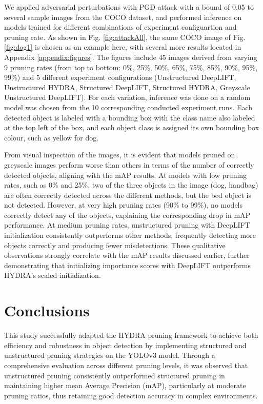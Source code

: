\documentclass[journal,onecolumn,12pt]{IEEEtran}
\begin{document}
We applied adversarial perturbations with PGD attack with a bound of 0.05 to several sample images from the COCO dataset, and performed inference on models trained for different combinations of experiment configuartion and pruning rate. As shown in Fig. \ref{fig:attackAll}, the same COCO image of Fig. \ref{fig:dog1} is chosen as an example here, with several more results located in Appendix \ref{appendix:figures}. The figures include 45 images derived from varying 9 pruning rates (from top to bottom: 0\%, 25\%, 50\%, 65\%, 75\%, 85\%, 90\%, 95\%, 99\%) and 5 different experiment configurations (Unstructured DeepLIFT, Unstructured HYDRA, Structured DeepLIFT, Structured HYDRA, Greyscale Unstructured DeepLIFT). For each variation, inference was done on a random model was chosen from the 10 corresponding conducted experiment runs. Each detected object is labeled with a bounding box with the class name also labeled at the top left of the box, and each object class is assigned its own bounding box colour, such as yellow for dog.

From visual inspection of the images, it is evident that models pruned on greyscale images perform worse than others in terms of the number of correctly detected objects, aligning with the mAP results. At models with low pruning rates, such as 0\% and 25\%, two of the three objects in the image (dog, handbag) are often correctly detected across the different methods, but the bed object is not detected. However, at very high pruning rates (90\% to 99\%), no models correctly detect any of the objects, explaining the corresponding drop in mAP performance. At medium pruning rates, unstructured pruning with DeepLIFT initialization consistently outperforms other methods, frequently detecting more objects correctly and producing fewer misdetections. These qualitative observations strongly correlate with the mAP results discussed earlier, further demonstrating that initializing importance scores with DeepLIFT outperforms HYDRA's scaled initialization.

\section{Conclusions}

This study successfully adapted the HYDRA pruning framework to achieve both efficiency and robustness in object detection by implementing structured and unstructured pruning strategies on the YOLOv3 model. Through a comprehensive evaluation across different pruning levels, it was observed that unstructured pruning consistently outperformed structured pruning in maintaining higher mean Average Precision (mAP), particularly at moderate pruning ratios, thus retaining good detection accuracy in complex environments. 
\end{document}
